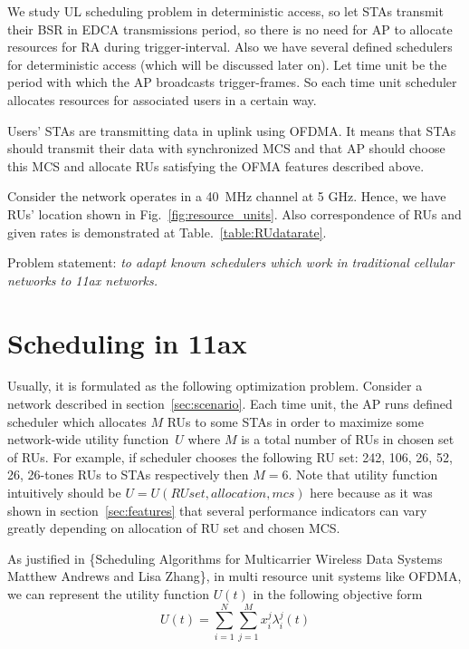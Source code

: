 We study UL scheduling problem in deterministic access, so let STAs transmit their BSR in EDCA transmissions period, so there is no need for AP to allocate resources for RA during trigger-interval.
Also we have several defined schedulers for deterministic access (which will be discussed later on). 
Let time unit be the period with which the AP broadcasts trigger-frames.
So each time unit scheduler allocates resources for associated users in a certain way.

Users' STAs are transmitting data in uplink using OFDMA. 
It means that STAs should transmit their data with synchronized MCS and that AP should choose this MCS and allocate RUs satisfying the OFMA features described above. 

Consider the network operates in a \SI{40}{\MHz} channel at 5 GHz. Hence, we have RUs' location shown in Fig.~\ref{fig:resource_units}. 
Also correspondence of RUs and given rates is demonstrated at Table.~\ref{table:RUdatarate}.

Problem statement: \textit{to adapt known schedulers which work in traditional cellular networks to 11ax networks.}

\section{Scheduling in 11ax}
\label{sec:scheduling}

Usually, it is formulated as the following optimization problem.
Consider a network described in section~\ref{sec:scenario}.
Each time unit, the AP runs defined scheduler which allocates $M$ RUs to some STAs in order to maximize some network-wide utility function~$U$ where $M$ is a total number of RUs in chosen set of RUs. 
For example, if scheduler chooses the following RU set: 242, 106, 26, 52, 26, 26-tones RUs to STAs respectively then $M = 6$. 
Note that utility function intuitively should be $U = U(RU set, allocation, mcs)$ here because as it was shown in section~\ref{sec:features} that several performance indicators can vary greatly depending on allocation of RU set and chosen MCS.

As justified in \{Scheduling Algorithms for Multicarrier Wireless
Data Systems
Matthew Andrews and Lisa Zhang\}, in multi resource unit systems like OFDMA, we can represent the utility function $U(t)$ in the following objective form
\begin{equation}
\label{eq:obj}
U(t) = \sum_{i = 1}^{N} \sum_{j = 1}^{M} x_i^j \lambda_i^j (t)
\end{equation}

